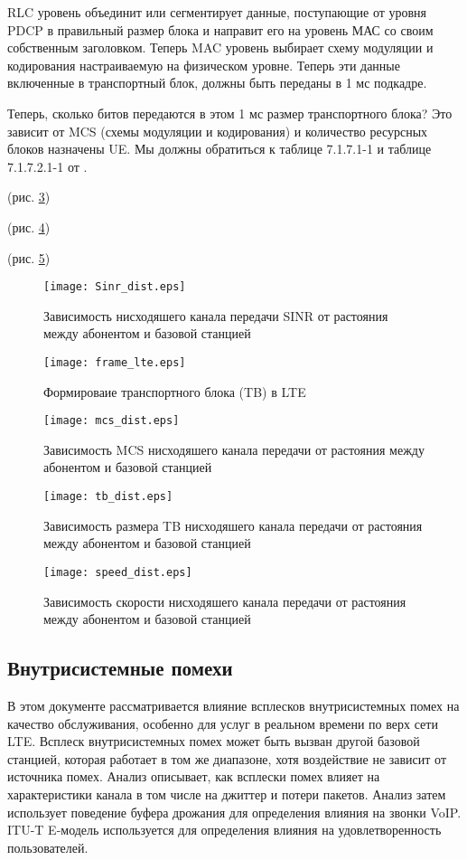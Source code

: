 RLC уровень объединит или сегментирует данные, поступающие от уровня PDCP в правильный размер блока и направит его на уровень МАС со своим собственным заголовком. Теперь MAC уровень выбирает схему модуляции и кодирования настраиваемую на физическом уровне. Теперь эти данные включенные в транспортный блок, должны быть переданы в 1 мс подкадре.

Теперь, сколько битов передаются в этом 1 мс размер транспортного блока? Это зависит от MCS (схемы модуляции и кодирования) и количество ресурсных блоков назначены UE. Мы должны обратиться к таблице 7.1.7.1-1 и таблице 7.1.7.2.1-1 от \cite{3GPPTS36213}.

(рис. \ref{img:mcs_dist})

(рис. \ref{img:tb_dist})

(рис. \ref{img:speed_dist})
\begin{figure} [H]
  \center
\texttt{[image: Sinr\_dist.eps]}
  \caption{Зависимость нисходяшего канала передачи SINR от растояния между абонентом и базовой станцией}
  \label{img:Sinr_dist}
\end{figure}

\begin{figure} [h]
  \center
\texttt{[image: frame\_lte.eps]}
  \caption{Формироваие транспортного блока (TB) в LTE}
  \label{img:frame_lte}
\end{figure}

\begin{figure} [h]
  \center
\texttt{[image: mcs\_dist.eps]}
  \caption{Зависимость MCS нисходяшего канала передачи от растояния между абонентом и базовой станцией}
  \label{img:mcs_dist}
\end{figure}

\begin{figure} [h]
  \center
\texttt{[image: tb\_dist.eps]}
  \caption{Зависимость размера TB нисходяшего канала передачи от растояния между абонентом и базовой станцией}
  \label{img:tb_dist}
\end{figure}

\begin{figure} [h]
  \center
\texttt{[image: speed\_dist.eps]}
  \caption{Зависимость скорости нисходяшего канала передачи от растояния между абонентом и базовой станцией}
  \label{img:speed_dist}
\end{figure}


\subsection{Внутрисистемные помехи}  \label{sect2_2_3}
В этом документе рассматривается влияние всплесков внутрисистемных помех на качество обслуживания, особенно для услуг в реальном времени по верх сети LTE. Всплеск внутрисистемных помех может быть вызван другой базовой станцией, которая работает в том же диапазоне, хотя воздействие не зависит от источника помех.
Анализ описывает, как всплески помех влияет на характеристики канала в том числе на джиттер и  потери пакетов. Анализ затем использует поведение буфера дрожания для определения влияния на звонки VoIP. ITU-T E-модель используется для определения влияния на удовлетворенность пользователей.


